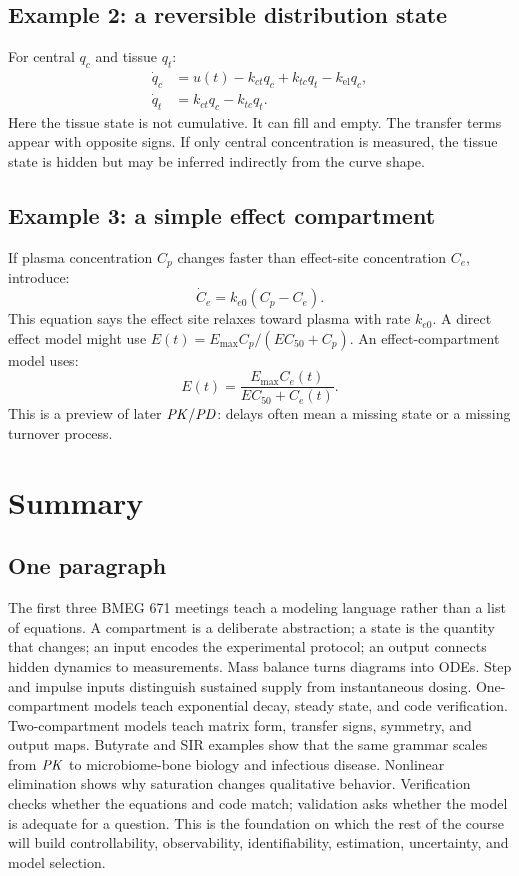 \documentclass[a4paper]{article}
\newcommand{\PK}{\ensuremath{\pksym{PK}}}
\newcommand{\PKPD}{\ensuremath{\pksym{PK}/\pksym{PD}}}
\begin{document}
\subsection{Example 2: a reversible distribution state}

For central \(q_c\) and tissue \(q_t\):
\[
  \begin{aligned}
  \dot q_c&=u(t)-k_{ct}q_c+k_{tc}q_t-k_{\mathrm{el}}q_c,\\
  \dot q_t&=k_{ct}q_c-k_{tc}q_t.
  \end{aligned}
\]
Here the tissue state is not cumulative. It can fill and empty. The transfer terms appear with opposite signs. If only central concentration is measured, the tissue state is hidden but may be inferred indirectly from the curve shape.

\subsection{Example 3: a simple effect compartment}

If plasma concentration \(C_p\) changes faster than effect-site concentration \(C_e\), introduce:
\[
  \dot C_e=k_{e0}(C_p-C_e).
\]
This equation says the effect site relaxes toward plasma with rate \(k_{e0}\). A direct effect model might use \(E(t)=E_{\max}C_p/(EC_{50}+C_p)\). An effect-compartment model uses:
\[
  E(t)=\frac{E_{\max}C_e(t)}{EC_{50}+C_e(t)}.
\]
This is a preview of later \PKPD{}: delays often mean a missing state or a missing turnover process.

\section{Summary}

\subsection{One paragraph}

The first three BMEG 671 meetings teach a modeling language rather than a list of equations. A compartment is a deliberate abstraction; a state is the quantity that changes; an input encodes the experimental protocol; an output connects hidden dynamics to measurements. Mass balance turns diagrams into ODEs. Step and impulse inputs distinguish sustained supply from instantaneous dosing. One-compartment models teach exponential decay, steady state, and code verification. Two-compartment models teach matrix form, transfer signs, symmetry, and output maps. Butyrate and SIR examples show that the same grammar scales from \PK{} to microbiome-bone biology and infectious disease. Nonlinear elimination shows why saturation changes qualitative behavior. Verification checks whether the equations and code match; validation asks whether the model is adequate for a question. This is the foundation on which the rest of the course will build controllability, observability, identifiability, estimation, uncertainty, and model selection.
\end{document}
